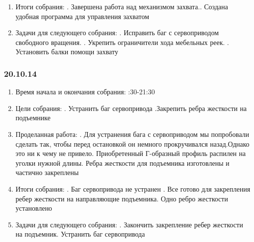 \documentclass[11pt]{article}
\begin{document}
\begin{enumerate}
            \item Итоги собрания:
            .   Завершена работа над механизмом захвата..   Создана удобная программа для управления захватом
            
            \item Задачи для следующего собрания:
            .   Исправить баг с сервоприводом свободного вращения.   .   Укрепить ограничители хода мебельных реек.   .   Установить балки помощи захвату
            
         \end{enumerate}
         \newpage
         \subsubsection{20.10.14}
         \begin{enumerate}
            \item Время начала и окончания собрания:
            :30-21:30
            \item Цели собрания:
            . Устранить баг сервопривода
            .Закрепить ребра жесткости на подъемнике
            \item Проделанная работа:
            . Для устранения бага с сервоприводом мы попробовали сделать так, чтобы перед остановкой он немного прокручивался назад.Однако это ни к чему не привело. Приобретенный Г-образный профиль распилен на уголки нужной длины.  Ребра жесткости для подъемника изготовлены и частично закреплены

            \item Итоги собрания:
            . Баг сервопривода не устранен
            . Все готово для закрепления ребер жесткости на направляющие подъемника. Одно ребро жесткости установлено
            \item Задачи для следующего собрания:
            . Закончить закрепление ребер жесткости на подъемник. Устранить баг сервопривода
         \end{enumerate}
         \newpage
\end{document}
